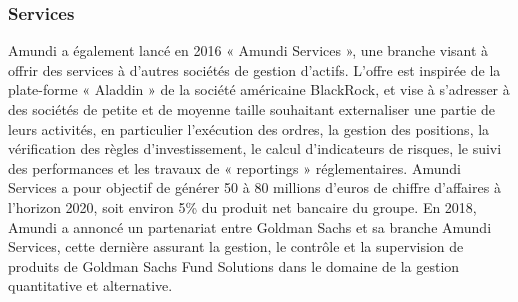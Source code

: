 \subsubsection{Services}
\par Amundi a également lancé en 2016 « Amundi Services », une branche visant à offrir des services à d’autres sociétés de gestion d’actifs. L’offre est inspirée de la plate-forme « Aladdin » de la société américaine BlackRock, et vise à s’adresser à des sociétés de petite et de moyenne taille souhaitant externaliser une partie de leurs activités, en particulier l’exécution des ordres, la gestion des positions, la vérification des règles d’investissement, le calcul d’indicateurs de risques, le suivi des performances et les travaux de « reportings » réglementaires. Amundi Services a pour objectif de générer 50 à 80 millions d'euros de chiffre d’affaires à l’horizon 2020, soit environ 5\% du produit net bancaire du groupe. En 2018, Amundi a annoncé un partenariat entre Goldman Sachs et sa branche Amundi Services, cette dernière assurant la gestion, le contrôle et la supervision de produits de Goldman Sachs Fund Solutions dans le domaine de la gestion quantitative et alternative.

